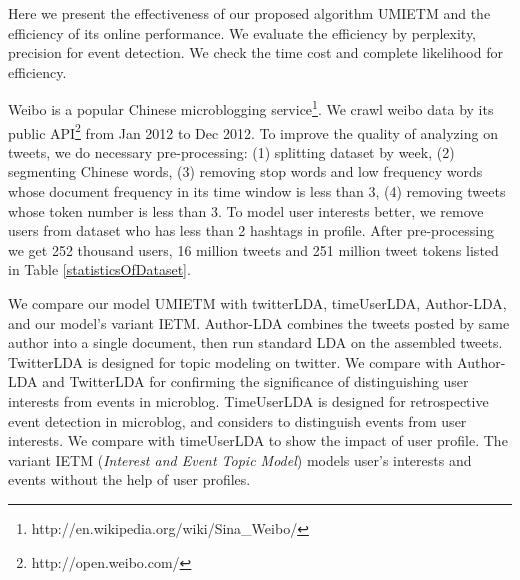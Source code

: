 \documentclass{sig-alternate-05-2015}
\begin{document}
Here we present the effectiveness of our proposed algorithm UMIETM and the efficiency of its online performance.
We evaluate the efficiency by perplexity, precision for event detection. 
We check the time cost and complete likelihood for efficiency.

Weibo is a popular Chinese microblogging service\footnote{http://en.wikipedia.org/wiki/Sina\_Weibo/}.
We crawl weibo data by  its public API\footnote{http://open.weibo.com/} from Jan 2012 to Dec 2012.
To improve the quality of analyzing on tweets, we do necessary pre-processing: (1) splitting dataset by week, (2) segmenting Chinese words, (3) removing stop words and low frequency words whose document frequency in its time window is less than 3, (4) removing tweets whose token number is less than 3.
To model user interests better,  we remove users from dataset who has less than 2 hashtags in profile.
After pre-processing we get 252 thousand users, 16 million tweets and 251 million tweet tokens listed in Table \ref{statisticsOfDataset}.

We compare our model UMIETM with twitterLDA, timeUserLDA, Author-LDA, and our model's variant IETM.
Author-LDA combines the tweets posted by same author into a single document, then run standard LDA on the assembled tweets.
TwitterLDA is designed for topic modeling on twitter.
We compare with Author-LDA and TwitterLDA for confirming the significance of distinguishing user interests from events in microblog.
TimeUserLDA is designed for retrospective event detection in microblog, and considers to distinguish events from user interests.
We compare with timeUserLDA to show the impact of user profile.
The variant IETM (\textit{Interest and Event Topic Model}) models user's interests and events without the help of user profiles.

\end{document}
